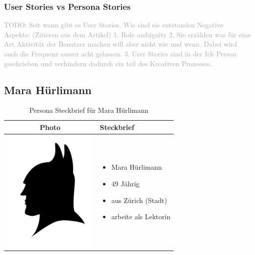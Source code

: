 \subsubsection{User Stories vs Persona Stories}


\textcolor{darkgray}{
  TODO: Seit wann gibt es User Stories, Wie sind sie entstanden
  Negative Aspekte: (Zitieren aus dem Artikel)
  1. Role ambiguity
  2. Sie erzählen was für eine Art Aktivität der Benutzer machen will aber nicht wie und wenn. Dabei wird auch die Frequenz ausser acht gelassen.
  3. User Stories sind in der Ich Person geschrieben und verhindern dadurch ein teil des Kreativen Prozesses.
}


\subsection{Mara Hürlimann}

\begin{table}[h!]
  \centering
  \begin{tabular}{ | c | m{5cm} | }
    \hline
    Photo & Steckbrief \\ \hline
    \begin{minipage}{.3\textwidth}
      \includegraphics[width=\linewidth, height=60mm]{images/batman.jpg}
    \end{minipage}
    &
      \begin{itemize}
        \item Mara Hürlimann
        \item 49 Jährig
        \item aus Zürich (Stadt)
        \item arbeite als Lektorin
      \end{itemize}
    \\ \hline
  \end{tabular}
  \caption{Persona Steckbrief für Mara Hürlimann}\label{tbl:steckbriefmara}
\end{table}

